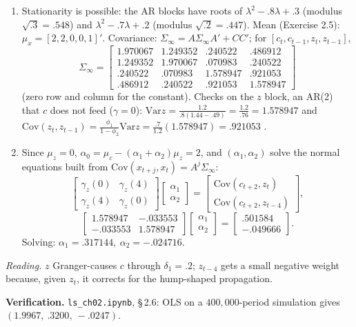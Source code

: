 \documentclass[12pt, letterpaper]{article}
\newcommand{\Var}{\mathrm{Var}}
\newcommand{\Cov}{\mathrm{Cov}}
\newcommand{\nb}[1]{\texttt{ls\_ch02.ipynb}, \S\,#1}
\begin{document}
\begin{tcolorbox}[evenbox,title={Exercise 2.6 \quad Stationary Moments and a Population Regression}]
\begin{enumerate}
\item Stationarity is possible: the AR blocks have roots of $\lambda^2-.8\lambda+.3$ (modulus
$\sqrt{.3}=.548$) and $\lambda^2-.7\lambda+.2$ (modulus $\sqrt{.2}=.447$). Mean (Exercise 2.5):
$\mu_x=[2,2,0,0,1]'$. Covariance: $\Sigma_\infty=A\Sigma_\infty A'+CC'$; for
$[c_t,c_{t-1},z_t,z_{t-1}]$,
\[
\Sigma_\infty=\begin{bmatrix}
1.970067&1.249352&.240522&.486912\\
1.249352&1.970067&.070983&.240522\\
.240522&.070983&1.578947&.921053\\
.486912&.240522&.921053&1.578947\end{bmatrix}
\]
(zero row and column for the constant). Checks on the $z$ block, an AR(2) that $c$ does not feed
($\gamma=0$): $\Var z=\frac{1.2}{.8(1.44-.49)}=\frac{1.2}{.76}=1.578947$ and
$\Cov(z_t,z_{t-1})=\frac{\phi_1}{1-\phi_2}\Var z=\frac{.7}{1.2}(1.578947)=.921053$ \checkmark.
\item Since $\mu_z=0$, $\alpha_0=\mu_c-(\alpha_1+\alpha_2)\mu_z=\boxed{2}$, and $(\alpha_1,\alpha_2)$
solve the normal equations built from $\Cov(x_{t+j},x_t)=A^j\Sigma_\infty$:
\[
\begin{bmatrix}\gamma_z(0)&\gamma_z(4)\\ \gamma_z(4)&\gamma_z(0)\end{bmatrix}
\begin{bmatrix}\alpha_1\\ \alpha_2\end{bmatrix}=
\begin{bmatrix}\Cov(c_{t+2},z_t)\\ \Cov(c_{t+2},z_{t-4})\end{bmatrix},
\]
\[
\begin{bmatrix}1.578947&-.033553\\-.033553&1.578947\end{bmatrix}
\begin{bmatrix}\alpha_1\\ \alpha_2\end{bmatrix}=
\begin{bmatrix}.501584\\-.049666\end{bmatrix}.
\]
Solving: $\boxed{\alpha_1=.317144,\ \alpha_2=-.024716}$.
\end{enumerate}
\emph{Reading.} $z$ Granger-causes $c$ through $\delta_1=.2$; $z_{t-4}$ gets a small negative weight
because, given $z_t$, it corrects for the hump-shaped propagation.

\textbf{Verification.} \nb{2.6}: OLS on a $400{,}000$-period simulation gives
$(1.9967,\ .3200,\ -.0247)$. \checkmark
\end{tcolorbox}
\end{document}

